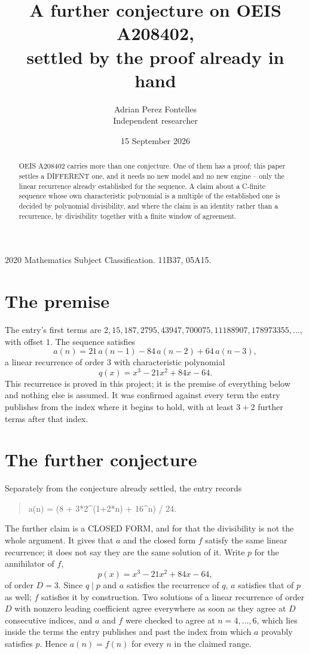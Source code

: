 \documentclass[11pt,a4paper]{article}
\title{A further conjecture on OEIS A208402,\\ \large settled by the proof already in hand}
\author{Adrian Perez Fontelles\\ \small Independent researcher}
\date{15 September 2026}
\theoremstyle{plain}
\theoremstyle{definition}
\begin{document}
\maketitle

\begin{abstract}
OEIS A208402 carries more than one conjecture. One of them has a proof; this paper settles a
DIFFERENT one, and it needs no new model and no new engine -- only the linear recurrence already
established for the sequence. A claim about a C-finite sequence whose own characteristic
polynomial is a multiple of the established one is decided by polynomial divisibility, and where
the claim is an identity rather than a recurrence, by divisibility together with a finite window
of agreement.
\end{abstract}

\noindent\small 2020 Mathematics Subject Classification. 11B37, 05A15.\normalsize

\section{The premise}

The entry's first terms are $2, 15, 187, 2795, 43947, 700075, 11188907, 178973355,\dots$, with offset $1$. The sequence satisfies
\[
  a(n)=21\,a(n-1) - 84\,a(n-2) + 64\,a(n-3) ,
\]
a linear recurrence of order $3$ with characteristic polynomial
\[
  q(x)=x^{3} - 21 x^{2} + 84 x - 64 .
\]
This recurrence is proved in this project; it is the premise of everything below and nothing else is assumed.
It was confirmed against every term the entry publishes from the index where it begins to hold,
with at least $3+2$ further terms after that index.

\section{The further conjecture}

Separately from the conjecture already settled, the entry records

\begin{quote}\raggedright a(n) = (8 + 3*2\^{}(1+2*n) + 16\^{}n) / 24.\end{quote}

The further claim is a CLOSED FORM, and for that the divisibility is not the whole argument. It
gives that $a$ and the closed form $f$ satisfy the same linear recurrence; it does not say they
are the same solution of it. Write $p$ for the annihilator of $f$,
\[
  p(x)=x^{3} - 21 x^{2} + 84 x - 64 ,
\]
of order $D=3$. Since $q\mid p$ and $a$ satisfies the recurrence of $q$, $a$ satisfies that of
$p$ as well; $f$ satisfies it by construction. Two solutions of a linear recurrence of order $D$
with nonzero leading coefficient agree everywhere as soon as they agree at $D$ consecutive
indices, and $a$ and $f$ were checked to agree at $n=4,\dots,6$,
which lies inside the terms the entry publishes and past the index from which $a$ provably
satisfies $p$. Hence $a(n)=f(n)$ for every $n$ in the claimed range.
\end{document}
